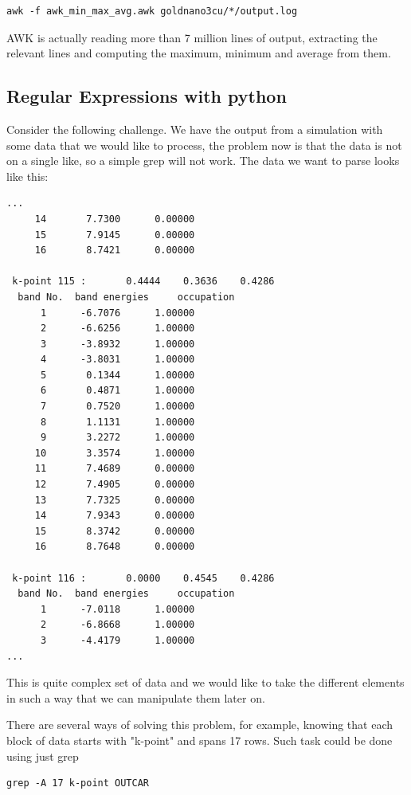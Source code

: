 \begin{lstlisting}
awk -f awk_min_max_avg.awk goldnano3cu/*/output.log
\end{lstlisting}

AWK is actually reading more than 7 million lines of output, extracting the relevant lines and computing the maximum, minimum and average from them.




\subsection{Regular Expressions with python}

Consider the following challenge.
We have the output from a simulation with some data that we would like to process, the problem now is that the data is not on a single like, so a simple grep will not work. The data we want to parse looks like this:

\begin{lstlisting}
...
     14       7.7300      0.00000
     15       7.9145      0.00000
     16       8.7421      0.00000

 k-point 115 :       0.4444    0.3636    0.4286
  band No.  band energies     occupation 
      1      -6.7076      1.00000
      2      -6.6256      1.00000
      3      -3.8932      1.00000
      4      -3.8031      1.00000
      5       0.1344      1.00000
      6       0.4871      1.00000
      7       0.7520      1.00000
      8       1.1131      1.00000
      9       3.2272      1.00000
     10       3.3574      1.00000
     11       7.4689      0.00000
     12       7.4905      0.00000
     13       7.7325      0.00000
     14       7.9343      0.00000
     15       8.3742      0.00000
     16       8.7648      0.00000

 k-point 116 :       0.0000    0.4545    0.4286
  band No.  band energies     occupation 
      1      -7.0118      1.00000
      2      -6.8668      1.00000
      3      -4.4179      1.00000
...
\end{lstlisting}

This is quite complex set of data and we would like to take the different elements in such a way that we can manipulate them later on.

There are several ways of solving this problem, for example, knowing that each block of data starts with "k-point"
 and spans 17 rows. Such task could be done using just grep
 
\begin{lstlisting}
grep -A 17 k-point OUTCAR 
\end{lstlisting}

